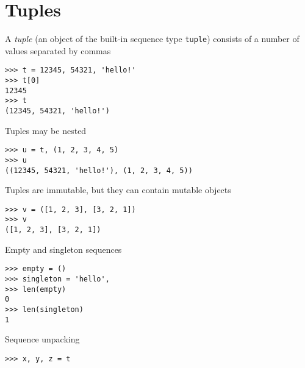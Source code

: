 \documentclass[8pt,a4paper,compress]{beamer}
\begin{document}
\section{Tuples}
\begin{frame}[fragile]
A \emph{tuple} (an object of the built-in sequence type \lstinline{tuple}) consists of a number of values separated by commas
\begin{lstlisting}[language={}]
>>> t = 12345, 54321, 'hello!'
>>> t[0]
12345
>>> t
(12345, 54321, 'hello!')
\end{lstlisting}

\bigskip

Tuples may be nested
\begin{lstlisting}[language={}]
>>> u = t, (1, 2, 3, 4, 5)
>>> u
((12345, 54321, 'hello!'), (1, 2, 3, 4, 5))
\end{lstlisting}

\bigskip

Tuples are immutable, but they can contain mutable objects
\begin{lstlisting}[language={}]
>>> v = ([1, 2, 3], [3, 2, 1])
>>> v
([1, 2, 3], [3, 2, 1])
\end{lstlisting}

\bigskip

Empty and singleton sequences
\begin{lstlisting}[language={}]
>>> empty = ()
>>> singleton = 'hello', 
>>> len(empty)
0
>>> len(singleton)
1
\end{lstlisting}

\bigskip

Sequence unpacking
\begin{lstlisting}[language={}]
>>> x, y, z = t
\end{lstlisting}
\end{frame}
\end{document}
